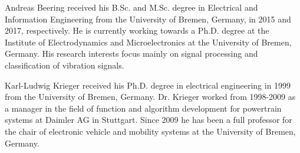 \documentclass{ieeeaccess}
\begin{document}
%
\vspace*{-1cm}
\begin{IEEEbiography}{Andreas Beering} received his B.Sc. and M.Sc. degree in Electrical and Information Engineering  from the University of Bremen, Germany, in 2015 and 2017, respectively. He is currently working towards a Ph.D. degree at the Institute of Electrodynamics and Microelectronics at the University of Bremen, Germany. His research interests focus mainly on signal processing and classification of vibration signals.
\end{IEEEbiography}

\vspace*{-1cm}
\begin{IEEEbiography}{Karl-Ludwig Krieger} received his Ph.D. degree in electrical engineering in 1999 from the University of Bremen, Germany. Dr. Krieger worked from 1998-2009 as a manager in the field of function and algorithm development for powertrain systems at Daimler AG in Stuttgart. Since 2009 he has been a full professor for the chair of electronic vehicle and mobility systems at the University of Bremen, Germany.
\end{IEEEbiography}

\EOD
\end{document}
